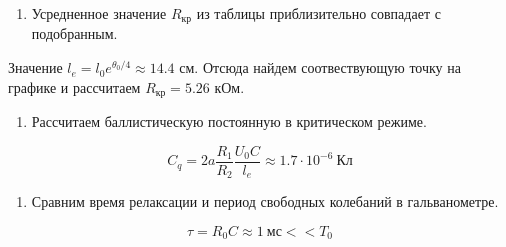 \documentclass[a4paper,12pt]{article}
\begin{document}
\begin{enumerate}[resume]
    \item Усредненное значение $R_\text{кр}$ из таблицы приблизительно совпадает с подобранным.
\end{enumerate}

Значение $l_e = l_0 e^{\theta_0/4} \approx 14.4$ см. Отсюда найдем соотвествующую точку на графике и рассчитаем $R_\text{кр} = 5.26$ кОм.

\begin{enumerate}[resume]
    \item Рассчитаем баллистическую постоянную в критическом режиме.
\end{enumerate}

\begin{equation*}
    C_q = 2a \frac{R_1}{R_2} \frac{U_0 C}{l_e} \approx 1.7 \cdot 10^{-6} \ \text{Кл}
\end{equation*}

\begin{enumerate}[resume]
    \item Сравним время релаксации и период свободных колебаний в гальванометре.
\end{enumerate}

\begin{equation*}
    \tau = R_0 C \approx 1 \ \text{мс} << T_0
\end{equation*}
\end{document}
